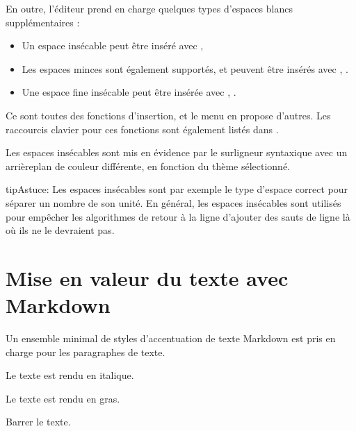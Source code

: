 \documentclass[a4paper,11pt,french]{sphinxmanual}
\begin{document}
\sphinxAtStartPar
En outre, l’éditeur prend en charge quelques types d’espaces blancs supplémentaires :
\begin{itemize}
\item {} 
\sphinxAtStartPar
Un espace insécable peut être inséré avec , 

\item {} 
\sphinxAtStartPar
Les espaces minces sont également supportés, et peuvent être insérés avec , .

\item {} 
\sphinxAtStartPar
Une espace fine insécable peut être insérée avec , .

\end{itemize}

\sphinxAtStartPar
Ce sont toutes des fonctions d’insertion, et le menu  en propose d’autres. Les raccourcis clavier pour ces fonctions sont également listés dans {\hyperref[\detokenize{usage_shortcuts:a-kb-ins}]{}}.

\sphinxAtStartPar
Les espaces insécables sont mis en évidence par le surligneur syntaxique avec un arrière\sphinxhyphen{}plan de couleur différente, en fonction du thème sélectionné.

\begin{sphinxadmonition}{tip}{Astuce:}
\sphinxAtStartPar
Les espaces insécables sont par exemple le type d’espace correct pour séparer un nombre de son unité. En général, les espaces insécables sont utilisés pour empêcher les algorithmes de retour à la ligne d’ajouter des sauts de ligne là où ils ne le devraient pas.
\end{sphinxadmonition}


\section{Mise en valeur du texte avec Markdown}
\label{\detokenize{usage_format:text-emphasis-with-markdown}}\label{\detokenize{usage_format:a-fmt-emph}}
\sphinxAtStartPar
Un ensemble minimal de styles d’accentuation de texte Markdown est pris en charge pour les paragraphes de texte.
\begin{description}
\sphinxAtStartPar
Le texte est rendu en italique.

\sphinxAtStartPar
Le texte est rendu en gras.

\sphinxAtStartPar
Barrer le texte.

\end{description}
\end{document}
